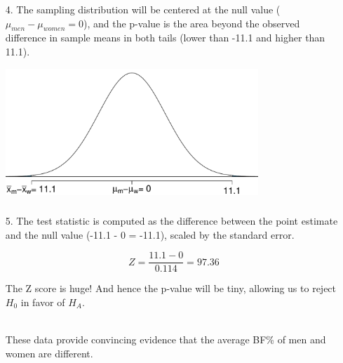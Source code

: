 
\begin{frame}
\frametitle{}

\begin{enumerate}

\item[4.] The sampling distribution will be centered at the null value ($\mu_{men} - \mu_{women} = 0$), and the p-value is the area beyond the observed difference in sample means in both tails (lower than -11.1 and higher than 11.1).

\begin{center}
\includegraphics[width=0.75\textwidth]{5-5_inf_other_est/figures/bf/bf}
\end{center}


\end{enumerate}

\end{frame}


\begin{frame}
\frametitle{}

\begin{enumerate}

\item[5.] The test statistic is computed as the difference between the point estimate and the null value (-11.1 - 0 = -11.1), scaled by the standard error.

\[ Z = \frac{11.1 - 0}{0.114} = 97.36 \]

The Z score is huge! And hence the p-value will be tiny, allowing us to reject $H_0$ in favor of $H_A$.

\pause

$\:$ \\

These data provide convincing evidence that the average BF\% of men and women are different.

\end{enumerate}

\end{frame}

